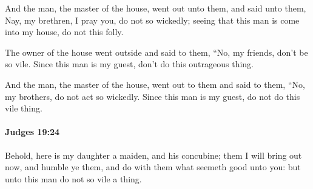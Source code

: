 			\begin{versebox}
					\item[BHS] 
					\item[ASV] And the man, the master of the house, went out unto them, and said unto them, Nay, my brethren, I pray you, do not so wickedly; seeing that this man is come into my house, do not this folly.
					\item[NIV] The owner of the house went outside and said to them, “No, my friends, don’t be so vile. Since this man is my guest, don’t do this outrageous thing.
					\item[NRSV] And the man, the master of the house, went out to them and said to them, “No, my brothers, do not act so wickedly. Since this man is my guest, do not do this vile thing.
			\end{versebox}

		\paragraph{Judges 19:24} %
			\label{JUDGES-19-24}

			Behold, here is my daughter a maiden, and his concubine; them I will bring out now, and humble ye them, and do with them what seemeth good unto you: but unto this man do not so vile a thing.

